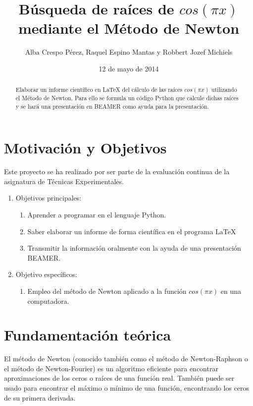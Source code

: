 \documentclass[a4paper,10pt]{article}
\begin{document}
\tableofcontents
\listoffigures
\listoftables
\title{Búsqueda de raíces de  $cos({\pi}x)$ mediante el Método de Newton}
\author{Alba Crespo Pérez, Raquel Espino Mantas y Robbert Jozef Michiels}
\date{12 de mayo de 2014}

\maketitle

\newpage

\begin{abstract}
Elaborar un informe científico en \LaTeX{} del cálculo de las raíces $cos({\pi}x)$ utilizando el Método de Newton. Para ello se formula un código Python que calcule dichas raíces y se hará una presentación en BEAMER como ayuda para la presentación.
\end{abstract}
\newpage
\section{Motivación y Objetivos}
Este proyecto se ha realizado por ser parte de la evaluación continua de la asignatura de Técnicas Experimentales.
\begin{enumerate}
  \item
    Objetivos principales:
      \begin{enumerate}
        \item
          Aprender a programar en el lenguaje Python.
        \item
          Saber elaborar un informe de forma científica en el programa \LaTeX 
        \item
          Transmitir la información oralmente con la ayuda de una presentación BEAMER. 
       \end{enumerate}
  \item
    Objetivo específicos:
       \begin{enumerate}
          \item
           Empleo del método de Newton aplicado a la función $cos({\pi}x)$ en una computadora.
       \end{enumerate}
\end{enumerate}

\newpage

\section{Fundamentación teórica}
El método de Newton (conocido también como el método de Newton-Raphson o el método de Newton-Fourier) es un algoritmo eficiente para encontrar aproximaciones de los ceros o raíces de una función real. También puede ser usado para encontrar el máximo o mínimo de una función, encontrando los ceros de su primera derivada.
\end{document}
